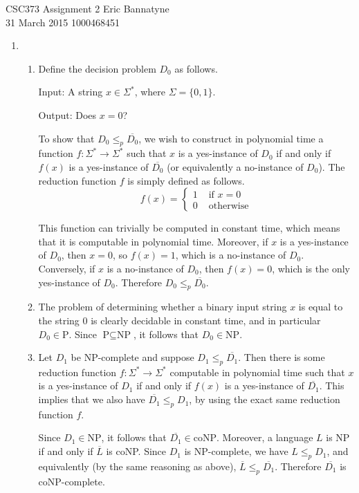 \documentclass[10pt]{article}
\begin{document}
\noindent CSC373 Assignment 2 \hfill Eric Bannatyne\\
31 March 2015 \hfill 1000468451\\

\begin{enumerate}

\item \begin{enumerate}

\item Define the decision problem \(D_0\) as follows.

Input: A string \(x \in \Sigma^*\), where \(\Sigma = \{0, 1\}\).

Output: Does \(x = 0\)?

To show that \(D_0 \leq_p \overline{D_0}\), we wish to construct in polynomial time a function \(f:\Sigma^* \to \Sigma^*\) such that \(x\) is a yes-instance of \(D_0\) if and only if \(f(x)\) is a yes-instance of \(\overline{D_0}\) (or equivalently a no-instance of \(D_0\)). The reduction function \(f\) is simply defined as follows. \[
f(x) = \begin{cases}
1 &\text{ if } x = 0\\
0 &\text{ otherwise}
\end{cases}
\]

This function can trivially be computed in constant time, which means that it is computable in polynomial time. Moreover, if \(x\) is a yes-instance of \(D_0\), then \(x = 0\), so \(f(x) = 1\), which is a no-instance of \(D_0\). Conversely, if \(x\) is a no-instance of \(D_0\), then \(f(x) = 0\), which is the only yes-instance of \(D_0\). Therefore \(D_0 \leq_p \overline{D_0}\).

\item The problem of determining whether a binary input string \(x\) is equal to the string 0 is clearly decidable in constant time, and in particular \(D_0 \in \text{P}\). Since \(\text{P} \subseteq \text{NP}\), it follows that \(D_0 \in \text{NP}\).

\item Let \(D_1\) be NP-complete and suppose \(D_1 \leq_p \overline{D_1}\). Then there is some reduction function \(f:\Sigma^* \to \Sigma^*\) computable in polynomial time such that \(x\) is a yes-instance of \(D_1\) if and only if \(f(x)\) is a yes-instance of \(\overline{D_1}\). This implies that we also have \(\overline{D_1} \leq_p D_1\), by using the exact same reduction function \(f\).

Since \(D_1 \in \text{NP}\), it follows that \(\overline{D_1} \in \text{coNP}\). Moreover, a language \(L\) is NP if and only if \(\overline{L}\) is coNP. Since \(D_1\) is NP-complete, we have \(L \leq_p D_1\), and equivalently (by the same reasoning as above), \(\overline{L} \leq_p \overline{D_1}\). Therefore \(\overline{D_1}\) is coNP-complete.


\end{enumerate}
\end{enumerate}
\end{document}

